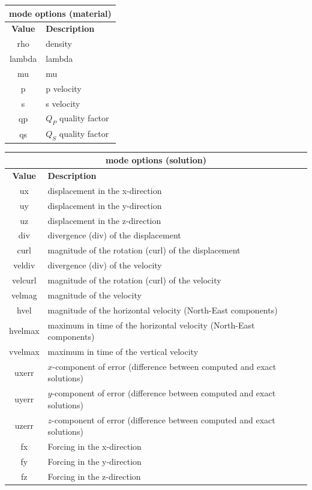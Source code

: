 \documentclass[11pt]{report}
\begin{document}
\begin{center}
\begin{tabular}{|c|l|} \hline
\multicolumn{2}{|c|}{\bf mode options (material)}\\ \hline
\bf{Value} & \bf{Description} \\ 
\hline  \hline
rho     & density \\ \hline
lambda  & lambda \\ \hline
mu      & mu \\ \hline
p       & p velocity \\ \hline
s       & s velocity \\ \hline
qp      & $Q_P$ quality factor \\ \hline
qs      & $Q_S$ quality factor \\ \hline
\end{tabular}
\end{center}
\begin{center}
\begin{tabular}{|c|l|} \hline
\multicolumn{2}{|c|}{\bf mode options (solution)}\\ \hline
\bf{Value} & \bf{Description} \\ 
\hline  \hline
ux      & displacement in the x-direction \\ \hline
uy      & displacement in the y-direction \\ \hline
uz      & displacement in the z-direction \\ \hline
div     & divergence (div) of the displacement \\ \hline
curl    & magnitude of the rotation (curl) of the displacement \\ \hline 
veldiv  & divergence (div) of the velocity \\ \hline
velcurl & magnitude of the rotation (curl) of the velocity \\ \hline
velmag  & magnitude of the velocity \\ \hline
hvel    & magnitude of the horizontal velocity (North-East components) \\ \hline
hvelmax & maximum in time of the horizontal velocity (North-East components) \\ \hline
vvelmax & maximum in time of the vertical velocity \\ \hline
uxerr   & $x$-component of error (difference between computed and exact solutions)\\ \hline
uyerr   & $y$-component of error (difference between computed and exact solutions)\\ \hline
uzerr   & $z$-component of error (difference between computed and exact solutions)\\ \hline
fx      & Forcing in the x-direction\\ \hline
fy      & Forcing in the y-direction\\ \hline
fz      & Forcing in the z-direction\\ \hline
\end{tabular}
\end{center}
\end{document}
